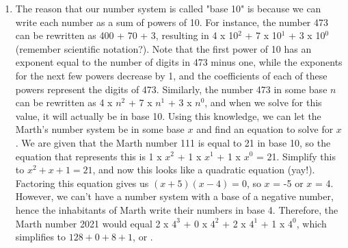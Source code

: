 \documentclass[14pt]{extarticle}
\begin{document}
\begin{enumerate}
    \item {The reason that our number system is called "base 10" is because we can write each number as a sum of powers of 10. For instance, the number 473 can be rewritten as 400 + 70 + 3, resulting in 4 x 10$^2$ + 7 x 10$^1$ + 3 x 10$^0$ (remember scientific notation?). Note that the first power of 10 has an exponent equal to the number of digits in 473 minus one, while the exponents for the next few powers decrease by 1, and the coefficients of each of these powers represent the digits of 473. Similarly, the number 473 in some base $n$ can be rewritten as 4 x $n^2$ + 7 x $n^1$ + 3 x $n^0$, and when we solve for this value, it will actually be in base 10. Using this knowledge, we can let the Marth's number system be in some base $x$ and find an equation to solve for $x$. We are given that the Marth number 111 is equal to 21 in base 10, so the equation that represents this is 1 x $x^2$ + 1 x $x^1$ + 1 x $x^0$ = 21. Simplify this to $x^2 + x + 1 = 21$, and now this looks like a quadratic equation (yay!). Factoring this equation gives us $(x + 5)(x - 4) = 0$, so $x$ = -5 or $x$ = 4. However, we can't have a number system with a base of a negative number, hence the inhabitants of Marth write their numbers in base 4. Therefore, the Marth number 2021 would equal 2 x $4^3$ + 0 x $4^2$ + 2 x $4^1$ + 1 x $4^0$, which simplifies to $128 + 0 + 8 + 1$, or .}
\end{enumerate}
\end{document}
